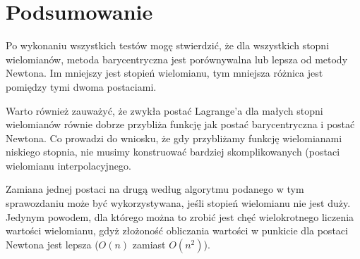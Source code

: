 \documentclass[a4paper]{article}
\begin{document}
\section{Podsumowanie}
Po wykonaniu wszystkich testów mogę stwierdzić, że dla wszystkich stopni wielomianów, 
metoda barycentryczna jest porównywalna lub lepsza od metody Newtona. Im mniejszy jest 
stopień wielomianu, tym mniejsza różnica jest pomiędzy tymi dwoma postaciami.

Warto również zauważyć, że zwykła postać Lagrange'a dla małych stopni wielomianów równie dobrze 
przybliża funkcję jak postać barycentryczna i postać Newtona. Co prowadzi do wniosku, że gdy 
przybliżamy funkcję wielomianami niskiego stopnia, nie musimy konstruować bardziej skomplikowanych
(postaci wielomianu interpolacyjnego. 

Zamiana jednej postaci na drugą według algorytmu podanego w tym sprawozdaniu może być wykorzystywana, 
jeśli stopień wielomianu nie jest duży. Jedynym powodem, dla którego można to zrobić jest chęć 
wielokrotnego liczenia wartości wielomianu, gdyż złożoność obliczania wartości w punkicie dla postaci
Newtona jest lepsza ($O(n)$ zamiast $O(n^2)$).
\end{document}
